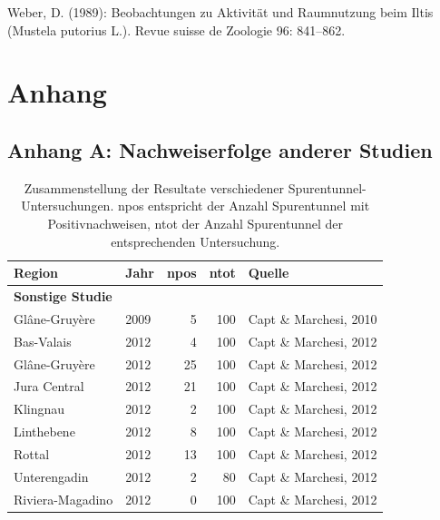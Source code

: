 \documentclass[
  oneside]{scrbook}
\begin{document}
Weber, D. (1989): Beobachtungen zu Aktivität und Raumnutzung beim Iltis (Mustela putorius L.). Revue suisse de Zoologie 96: 841--862.

\hypertarget{anhang}{%
\chapter{Anhang}\label{anhang}}

\hypertarget{anhang-zusammenstellung}{%
\section{Anhang A: Nachweiserfolge anderer Studien}\label{anhang-zusammenstellung}}

\begin{table}[H]

\caption{\label{tab:unnamed-chunk-12}Zusammenstellung der Resultate verschiedener Spurentunnel-Untersuchungen. npos entspricht der Anzahl Spurentunnel mit Positivnachweisen, ntot der Anzahl Spurentunnel der entsprechenden Untersuchung.}
\centering
\begin{tabular}[t]{l|l|r|r|l}
\hline
Region & Jahr & npos & ntot & Quelle\\
\hline
\multicolumn{5}{l}{\textbf{Sonstige Studie}}\\
\hline
\hspace{1em}Glâne-Gruyère & 2009 & 5 & 100 & Capt \& Marchesi, 2010\\
\hline
\hspace{1em}Bas-Valais & 2012 & 4 & 100 & Capt \& Marchesi, 2012\\
\hline
\hspace{1em}Glâne-Gruyère & 2012 & 25 & 100 & Capt \& Marchesi, 2012\\
\hline
\hspace{1em}Jura Central & 2012 & 21 & 100 & Capt \& Marchesi, 2012\\
\hline
\hspace{1em}Klingnau & 2012 & 2 & 100 & Capt \& Marchesi, 2012\\
\hline
\hspace{1em}Linthebene & 2012 & 8 & 100 & Capt \& Marchesi, 2012\\
\hline
\hspace{1em}Rottal & 2012 & 13 & 100 & Capt \& Marchesi, 2012\\
\hline
\hspace{1em}Unterengadin & 2012 & 2 & 80 & Capt \& Marchesi, 2012\\
\hline
\hspace{1em}Riviera-Magadino & 2012 & 0 & 100 & Capt \& Marchesi, 2012\\

\end{tabular}
\end{table}
\end{document}
